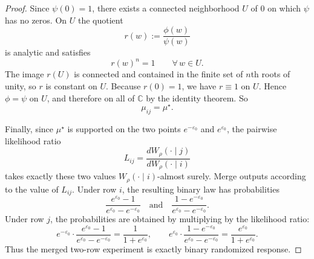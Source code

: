 \documentclass[10pt,a4paper]{amsart}
\begin{document}
\begin{proof}
Since $\psi(0)=1$, there exists a connected neighborhood $U$ of $0$ on which $\psi$ has no zeros. On $U$ the quotient
\[
r(w):=\frac{\phi(w)}{\psi(w)}
\]
is analytic and satisfies
\[
r(w)^n=1\qquad \forall\,w\in U.
\]
The image $r(U)$ is connected and contained in the finite set of $n$th roots of unity, so $r$ is constant on $U$. Because $r(0)=1$, we have $r\equiv 1$ on $U$. Hence $\phi=\psi$ on $U$, and therefore on all of $\mathbb C$ by the identity theorem. So
\[
\mu_{ij}=\mu^\star.
\]

Finally, since $\mu^\star$ is supported on the two points $e^{-\varepsilon_0}$ and $e^{\varepsilon_0}$, the pairwise likelihood ratio
\[
L_{ij}=\frac{dW_\rho(\cdot\mid j)}{dW_\rho(\cdot\mid i)}
\]
takes exactly these two values $W_\rho(\cdot\mid i)$-almost surely. Merge outputs according to the value of $L_{ij}$. Under row $i$, the resulting binary law has probabilities
\[
\frac{e^{\varepsilon_0}-1}{e^{\varepsilon_0}-e^{-\varepsilon_0}}
\quad\text{and}\quad
\frac{1-e^{-\varepsilon_0}}{e^{\varepsilon_0}-e^{-\varepsilon_0}}.
\]
Under row $j$, the probabilities are obtained by multiplying by the likelihood ratio:
\[
e^{-\varepsilon_0}\cdot \frac{e^{\varepsilon_0}-1}{e^{\varepsilon_0}-e^{-\varepsilon_0}}
=
\frac{1}{1+e^{\varepsilon_0}},
\qquad
e^{\varepsilon_0}\cdot \frac{1-e^{-\varepsilon_0}}{e^{\varepsilon_0}-e^{-\varepsilon_0}}
=
\frac{e^{\varepsilon_0}}{1+e^{\varepsilon_0}}.
\]
Thus the merged two-row experiment is exactly binary randomized response.
\end{proof}
\end{document}
